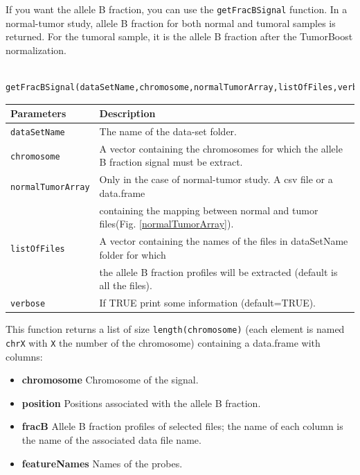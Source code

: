 \documentclass[a4paper,10pt]{article}
\begin{document}
		If you want the allele B fraction, you can use the \texttt{getFracBSignal} function. In a normal-tumor study, allele B fraction for both normal and tumoral samples is returned. For the tumoral sample, it is the allele B fraction after the TumorBoost normalization.
		
		\begin{verbatim}	
		getFracBSignal(dataSetName,chromosome,normalTumorArray,listOfFiles,verbose)
		\end{verbatim}
	
		\begin{center}
			\begin{tabular}{|l|l|}
				\hline
				Parameters & Description\\
				\hline
				\texttt{dataSetName} & The name of the data-set folder.\\
				\texttt{chromosome} & A vector containing the chromosomes for which the allele B fraction signal must be extract.\\
				\texttt{normalTumorArray} & Only in the case of normal-tumor study. A csv file or a data.frame\\
				~~ & containing the mapping between normal and tumor files(Fig. \ref{normalTumorArray}).\\
				\texttt{listOfFiles} & A vector containing the names of the files in dataSetName folder for which\\
  			~ & the allele B fraction profiles will be extracted (default is all the files).\\
				\texttt{verbose} & If TRUE print some information (default=TRUE).\\
				\hline	
			\end{tabular}		
		\end{center}
				

		This function returns a list of size \texttt{length(chromosome)} (each element is named \texttt{chrX} with \texttt{X} the number of the chromosome) containing a data.frame with columns:
		\begin{itemize}
			\item \textbf{chromosome} Chromosome of the signal.
			\item \textbf{position} Positions associated with the allele B fraction.
			\item \textbf{fracB} Allele B fraction profiles of selected files; the name of each column is the name of the associated data file name. 		
			\item \textbf{featureNames} Names of the probes.
		\end{itemize}
		~~\\
		
\end{document}
